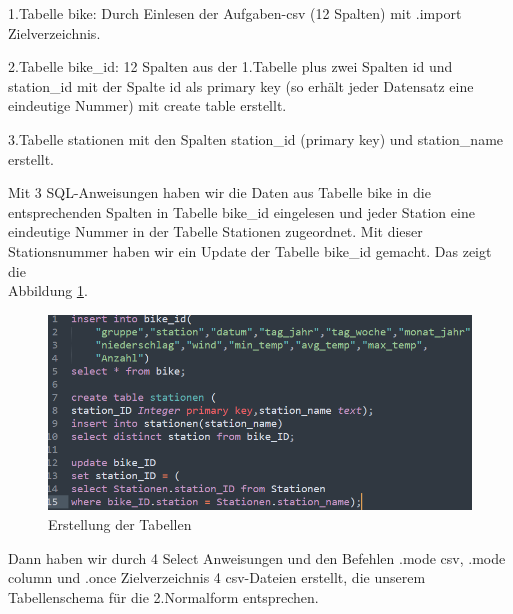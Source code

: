 \documentclass{article}
\begin{document}
1.Tabelle \glqq bike\grqq{}: Durch Einlesen der Aufgaben-csv (12 Spalten) mit \glqq .import Zielverzeichnis\grqq{}.

2.Tabelle \glqq bike\_id\grqq{}: 12 Spalten aus der 1.Tabelle plus zwei Spalten \glqq id\grqq{} und \glqq station\_id\grqq{} mit der Spalte \glqq id\grqq{} als primary key (so erhält jeder Datensatz eine eindeutige Nummer) mit \glqq create table\grqq{} erstellt.

3.Tabelle \glqq stationen\grqq{} mit den Spalten \glqq station\_id\grqq{} (primary key) und \glqq station\_name\grqq{} erstellt.

Mit 3 SQL-Anweisungen haben wir die Daten aus Tabelle \glqq bike\grqq{} in die entsprechenden Spalten in Tabelle \glqq bike\_id\grqq{} eingelesen und jeder Station eine eindeutige Nummer in der Tabelle \glqq Stationen\grqq{} zugeordnet. Mit dieser Stationsnummer haben wir ein Update der Tabelle \glqq bike\_id\grqq{} gemacht. Das zeigt die\\ Abbildung \ref{fig:Abb4}.

\newpage
\begin{figure}[ht]
    \centering
    \includegraphics[width= \textwidth]{Abbildung_4.png}
    \caption{Erstellung der Tabellen}
    \label{fig:Abb4}
\end{figure}

Dann haben wir durch 4 Select Anweisungen und den Befehlen \glqq .mode csv\grqq{}, \glqq .mode column\grqq{} und \glqq .once Zielverzeichnis\grqq{} 4 csv-Dateien erstellt, die  unserem Tabellenschema für die 2.Normalform entsprechen.
\end{document}
